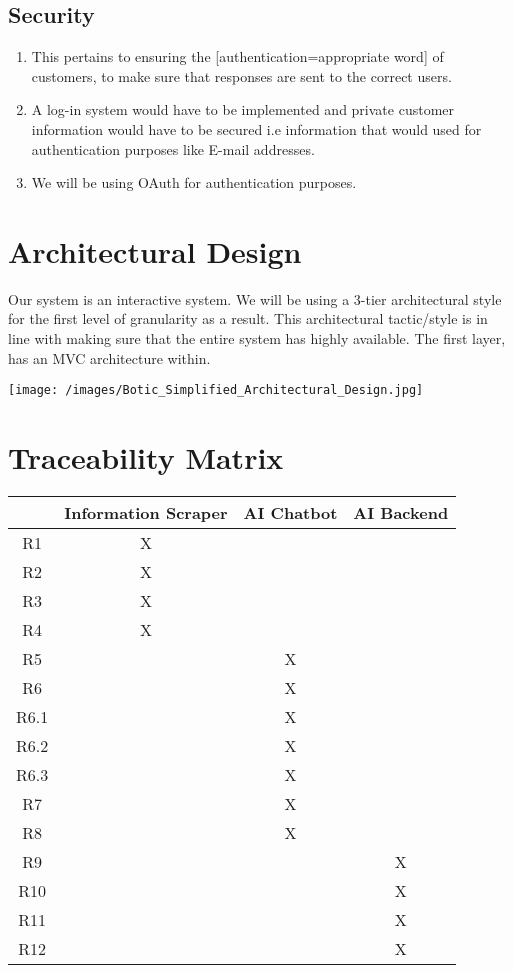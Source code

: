 \documentclass[11pt]{article}
\begin{document}
\subsection{Security}
\begin{enumerate}
    \item This pertains to ensuring the [authentication=appropriate word] of customers, to make sure that responses are sent to the correct users.
    \item A log-in system would have to be implemented and private customer information would have to be secured i.e information that would used for authentication purposes like E-mail addresses.
    \item We will be using OAuth for authentication purposes.

\end{enumerate}

\section{Architectural Design}
Our system is an interactive system. We will be using a 3-tier architectural style for the first level of granularity as a result. This architectural tactic/style is in line with making sure that the entire system has highly available. The first layer, has an MVC architecture within.

 \texttt{[image: /images/Botic\_Simplified\_Architectural\_Design.jpg]}

\section{Traceability Matrix}
\begin{center}
 \begin{tabular}{||c | c | c | c ||} 
 \hline
  & Information Scraper & AI Chatbot & AI Backend \\
 \hline\hline
 R1 & X &  &  \\
 \hline
 R2 & X &  &  \\
 \hline
 R3 & X &  &  \\
 \hline
 R4 & X &  &  \\
 \hline
 R5 &  & X &  \\
 \hline
 R6 &  & X &  \\
 \hline
 R6.1 &  & X &  \\
 \hline
 R6.2 &  & X &  \\
 \hline
 R6.3 &  & X &  \\
 \hline
 R7 &  & X &  \\
 \hline
 R8 &  & X &  \\
 \hline
 R9 &  &  & X \\
 \hline
 R10 &  &  & X \\
 \hline
 R11 &  &  & X \\
 \hline
 R12 &  &  & X \\
 \hline

\end{tabular}
\end{center}
\end{document}

